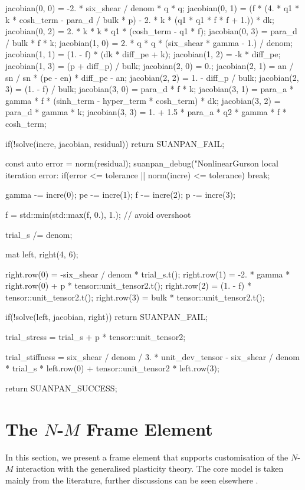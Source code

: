 \begin{cppcode}
{{        jacobian(0, 0) = -2. * six_shear / denom * q * q;
        jacobian(0, 1) = (f * (4. * q1 * k * cosh_term - para_d / bulk * p) - 2. * k * (q1 * q1 * f * f + 1.)) * dk;
        jacobian(0, 2) = 2. * k * k * q1 * (cosh_term - q1 * f);
        jacobian(0, 3) = para_d / bulk * f * k;
        jacobian(1, 0) = 2. * q * q * (six_shear * gamma - 1.) / denom;
        jacobian(1, 1) = (1. - f) * (dk * diff_pe + k);
        jacobian(1, 2) = -k * diff_pe;
        jacobian(1, 3) = (p + diff_p) / bulk;
        jacobian(2, 0) = 0.;
        jacobian(2, 1) = an / sn / sn * (pe - en) * diff_pe - an;
        jacobian(2, 2) = 1. - diff_p / bulk;
        jacobian(2, 3) = (1. - f) / bulk;
        jacobian(3, 0) = para_d * f * k;
        jacobian(3, 1) = para_a * gamma * f * (sinh_term - hyper_term * cosh_term) * dk;
        jacobian(3, 2) = para_d * gamma * k;
        jacobian(3, 3) = 1. + 1.5 * para_a * q2 * gamma * f * cosh_term;

        if(!solve(incre, jacobian, residual)) return SUANPAN_FAIL;

        const auto error = norm(residual);
        suanpan_debug("NonlinearGurson local iteration error: %
        if(error <= tolerance || norm(incre) <= tolerance) break;

        gamma -= incre(0);
        pe -= incre(1);
        f -= incre(2);
        p -= incre(3);

        f = std::min(std::max(f, 0.), 1.); // avoid overshoot
    }

    trial_s /= denom;

    mat left, right(4, 6);

    right.row(0) = -six_shear / denom * trial_s.t();
    right.row(1) = -2. * gamma * right.row(0) + p * tensor::unit_tensor2.t();
    right.row(2) = (1. - f) * tensor::unit_tensor2.t();
    right.row(3) = bulk * tensor::unit_tensor2.t();

    if(!solve(left, jacobian, right)) return SUANPAN_FAIL;

    trial_stress = trial_s + p * tensor::unit_tensor2;

    trial_stiffness = six_shear / denom / 3. * unit_dev_tensor - six_shear / denom * trial_s * left.row(0) + tensor::unit_tensor2 * left.row(3);

    return SUANPAN_SUCCESS;
}
\end{cppcode}
\section{The \texorpdfstring{$N$-$M$}{N-M} Frame Element}
In this section, we present a frame element that supports customisation of the $N$-$M$ interaction with the generalised plasticity theory. The core model is taken mainly from the literature, further discussions can be seen elsewhere \cite{Chang2023}.

